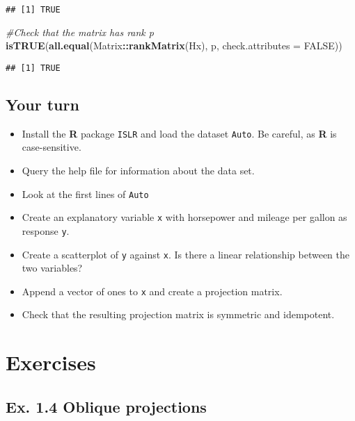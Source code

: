 \documentclass[]{book}
\newenvironment{Shaded}{\begin{snugshade}}{\end{snugshade}}
\newcommand{\KeywordTok}[1]{\textcolor[rgb]{0.13,0.29,0.53}{\textbf{#1}}}
\newcommand{\DataTypeTok}[1]{\textcolor[rgb]{0.13,0.29,0.53}{#1}}
\newcommand{\CommentTok}[1]{\textcolor[rgb]{0.56,0.35,0.01}{\textit{#1}}}
\newcommand{\OtherTok}[1]{\textcolor[rgb]{0.56,0.35,0.01}{#1}}
\newcommand{\OperatorTok}[1]{\textcolor[rgb]{0.81,0.36,0.00}{\textbf{#1}}}
\newcommand{\NormalTok}[1]{#1}
\providecommand{\tightlist}{%
  \setlength{\itemsep}{0pt}\setlength{\parskip}{0pt}}
\theoremstyle{definition}
\theoremstyle{definition}
\theoremstyle{definition}
\theoremstyle{remark}
\begin{document}
\begin{verbatim}
## [1] TRUE
\end{verbatim}

\begin{Shaded}
\begin{Highlighting}[]
\CommentTok{#Check that the matrix has rank p}
\KeywordTok{isTRUE}\NormalTok{(}\KeywordTok{all.equal}\NormalTok{(Matrix}\OperatorTok{::}\KeywordTok{rankMatrix}\NormalTok{(Hx), p, }\DataTypeTok{check.attributes =} \OtherTok{FALSE}\NormalTok{))}
\end{Highlighting}
\end{Shaded}

\begin{verbatim}
## [1] TRUE
\end{verbatim}

\subsection{Your turn}\label{your-turn}

\begin{itemize}
\tightlist
\item
  Install the \textbf{R} package \texttt{ISLR} and load the dataset
  \texttt{Auto}. Be careful, as \textbf{R} is case-sensitive.
\item
  Query the help file for information about the data set.
\item
  Look at the first lines of \texttt{Auto}
\item
  Create an explanatory variable \texttt{x} with horsepower and mileage
  per gallon as response \texttt{y}.
\item
  Create a scatterplot of \texttt{y} against \texttt{x}. Is there a
  linear relationship between the two variables?
\item
  Append a vector of ones to \texttt{x} and create a projection matrix.
\item
  Check that the resulting projection matrix is symmetric and
  idempotent.
\end{itemize}

\section{Exercises}\label{exercises}

\subsection{Ex. 1.4 Oblique
projections}\label{ex.-1.4-oblique-projections}
\end{document}
